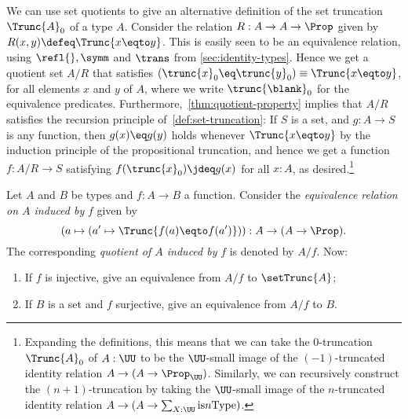 \begin{remark}\label{rem:set-trunc-as-quotient}
We can use set quotients to give an alternative definition
of the set truncation $\Trunc{A}_0$ of a type $A$.
Consider the relation $R : A \to A \to \Prop$ given by
$R(x,y) \defeq \Trunc {x \eqto y}$.
This is easily seen to be an equivalence relation,
using $\refl{},\symm$ and $\trans$ from \cref{sec:identity-types}.
Hence we get a quotient set $A/R$ that satisfies
$(\trunc{x}_0 \eq \trunc{y}_0) \equiv \Trunc{x\eqto y}$,
for all elements $x$ and $y$ of $A$,
where we write $\trunc{\blank}_0$ for the equivalence predicates.
Furthermore,~\cref{thm:quotient-property} implies that
$A/R$ satisfies the recursion principle of~\cref{def:set-truncation}:
If $S$ is a set, and $g:A\to S$ is any function,
then $g(x) \eq g(y)$ holds whenever $\Trunc{x\eqto y}$
by the induction principle of the propositional truncation,
and hence we get a function $f : A/R \to S$ satisfying
$f(\trunc{x}_0)\jdeq g(x)$ for all $x:A$, as desired.\footnote{%
  Expanding the definitions,
  this means that we can take the $0$-truncation $\Trunc{A}_0$
  of $A:\UU$ to be the $\UU$-small image
  of the $(-1)$-truncated identity relation
  $A \to (A \to \Prop_\UU)$.
  Similarly, we can recursively construct the $(n+1)$-truncation
  by taking the $\UU$-small image
  of the $n$-truncated identity relation
  $A \to (A \to \sum_{X:\UU}\mathrm{is}{n}\mathrm{Type})$.}
\end{remark}

\begin{xca}\label{xca:map-induces-quotient}
Let $A$ and $B$ be types and $f:A\to B$ a function.
Consider the \emph{equivalence relation on $A$ induced by} $f$ 
given by 
\[
(a\mapsto(a'\mapsto\Trunc{f(a)\eqto f(a')})) : A\to (A\to\Prop).
\]
The corresponding \emph{quotient of $A$ induced by} $f$ is denoted by $A/f$.
Now:
\begin{enumerate}
\item\label{it:inj-ind-settrunc=domain}
If $f$ is injective, give an equivalence from $A/f$ to $\setTrunc{A}$;
\item\label{it:surj-ind-quot=codomain}
If $B$ is a set and $f$ surjective, give an equivalence from $A/f$ to $B$.
\qedhere
\end{enumerate}
\end{xca}

